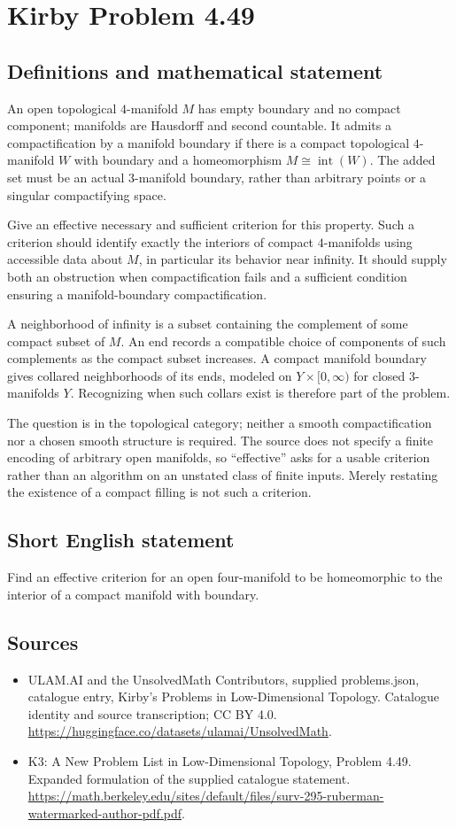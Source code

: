 \documentclass[11pt,a4paper]{article}
\begin{document}
\section*{Kirby Problem 4.49}\label{statement}

\subsection{Definitions and mathematical statement}
An open topological $4$-manifold $M$ has empty boundary and no compact
component; manifolds are Hausdorff and second countable. It admits a
compactification by a manifold boundary if there is a compact topological
$4$-manifold $W$ with boundary and a homeomorphism
$M\cong\operatorname{int}(W)$. The added set must be an actual
$3$-manifold boundary, rather than arbitrary points or a singular
compactifying space.

Give an effective necessary and sufficient criterion for this property.
Such a criterion should identify exactly the interiors of compact
$4$-manifolds using accessible data about $M$, in particular its behavior
near infinity. It should supply both an obstruction when compactification
fails and a sufficient condition ensuring a manifold-boundary
compactification.

A neighborhood of infinity is a subset containing the complement of
some compact subset of $M$. An end records a compatible choice of
components of such complements as the compact subset increases.
A compact manifold boundary gives collared neighborhoods of its ends,
modeled on $Y\times[0,\infty)$ for closed $3$-manifolds $Y$.
Recognizing when such collars exist is therefore part of the problem.

The question is in the topological category; neither a smooth
compactification nor a chosen smooth structure is required. The source
does not specify a finite encoding of arbitrary open manifolds, so
``effective'' asks for a usable criterion rather than an algorithm
on an unstated class of finite inputs. Merely restating the existence
of a compact filling is not such a criterion.
\subsection{Short English statement}
Find an effective criterion for an open four-manifold to be homeomorphic to the interior of a compact manifold with boundary.
\subsection{Sources}
\begin{itemize}
\item[S1] ULAM.AI and the UnsolvedMath Contributors, supplied problems.json, catalogue entry, Kirby's Problems in Low-Dimensional Topology. Catalogue identity and source transcription; CC BY 4.0.
\url{https://huggingface.co/datasets/ulamai/UnsolvedMath}.
\item[S2] K3: A New Problem List in Low-Dimensional Topology, Problem 4.49. Expanded formulation of the supplied catalogue statement.
\url{https://math.berkeley.edu/sites/default/files/surv-295-ruberman-watermarked-author-pdf.pdf}.
\end{itemize}
\end{document}

